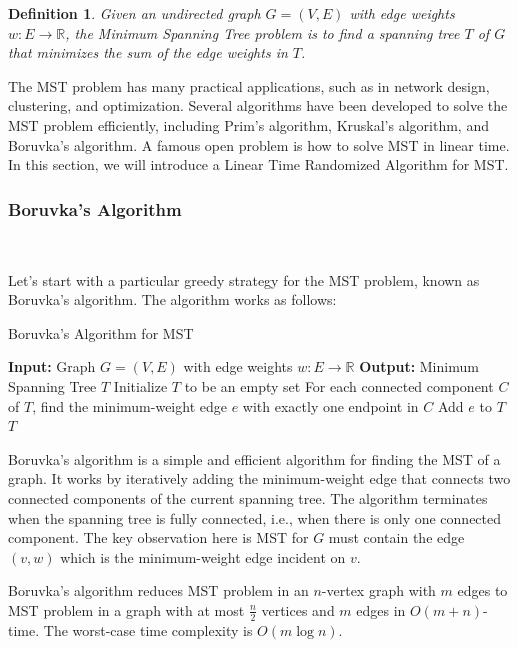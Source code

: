 \documentclass[11pt]{article}
\theoremstyle{plain}
\newtheorem{definition}{Definition}[section]
\begin{document}
\begin{definition}
    Given an undirected graph $G=(V,E)$ with edge weights $w:E\to \mathbb{R}$, the Minimum Spanning Tree problem is to find a spanning tree $T$ of $G$ that minimizes the sum of the edge weights in $T$.
\end{definition}

The MST problem has many practical applications, such as in network design, clustering, and optimization. Several algorithms have been developed to solve the MST problem efficiently, including Prim's algorithm, Kruskal's algorithm, and Boruvka's algorithm. A famous open problem is how to solve MST in linear time. In this section, we will introduce a Linear Time Randomized Algorithm for MST.

\subsubsection{Boruvka's Algorithm}\

Let's start with a particular greedy strategy for the MST problem, known as Boruvka's algorithm. The algorithm works as follows:
\newline
\begin{algorithm}
\caption{Boruvka's Algorithm for MST}
\label{alg:boruvka}
\begin{algorithmic}[1]
    \STATE \textbf{Input:} Graph $G=(V,E)$ with edge weights $w:E\to \mathbb{R}$
    \STATE \textbf{Output:} Minimum Spanning Tree $T$
    \STATE Initialize $T$ to be an empty set
        \STATE For each connected component $C$ of $T$, find the minimum-weight edge $e$ with exactly one endpoint in $C$
        \STATE Add $e$ to $T$
    \ENDWHILE
    \RETURN $T$
\end{algorithmic}
\end{algorithm}

Boruvka's algorithm is a simple and efficient algorithm for finding the MST of a graph. It works by iteratively adding the minimum-weight edge that connects two connected components of the current spanning tree. The algorithm terminates when the spanning tree is fully connected, i.e., when there is only one connected component. The key observation here is MST for $G$ must contain the edge $(v,w)$ which is the minimum-weight edge incident on $v$.

Boruvka's algorithm reduces MST problem in an $n$-vertex graph with $m$ edges to MST problem in a graph with at most $\frac{n}{2}$ vertices and $m$ edges in $O(m+n)$-time. The worst-case time complexity is $O(m\log n)$.
\end{document}
